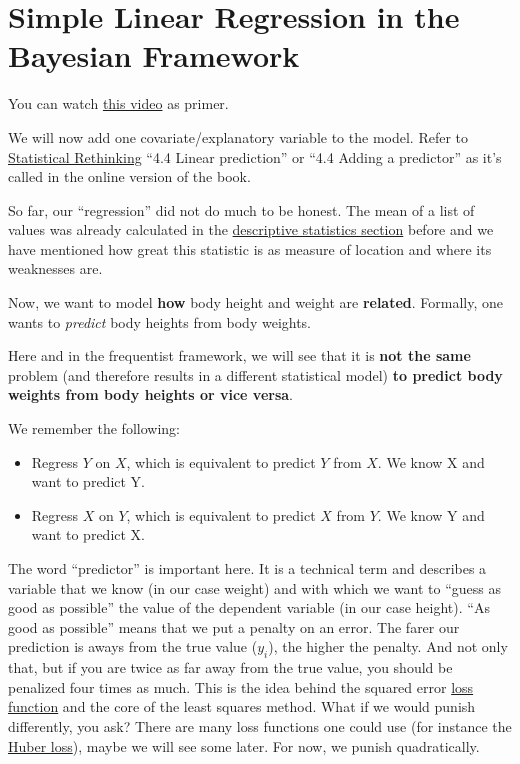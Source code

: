 \documentclass[
]{book}
\providecommand{\tightlist}{%
  \setlength{\itemsep}{0pt}\setlength{\parskip}{0pt}}
\begin{document}
\section{Simple Linear Regression in the Bayesian Framework}\label{simple_lin_reg_bayes}

You can watch \href{https://www.youtube.com/watch?v=14mkCpJ7tKs&ab_channel=VeryNormal}{this video} as primer.

We will now add one covariate/explanatory variable to the model.
Refer to \href{https://civil.colorado.edu/~balajir/CVEN6833/bayes-resources/RM-StatRethink-Bayes.pdf}{Statistical Rethinking}
``4.4 Linear prediction'' or ``4.4 Adding a predictor'' as it's called in the online version of the book.

So far, our ``regression'' did not do much to be honest. The mean of a list of values
was already calculated in the \href{https://jdegenfellner.github.io/Script_QM1_ZHAW/descriptive_stats.html}{descriptive statistics section}
before and we have mentioned how great this statistic is as measure of location and where its weaknesses are.

Now, we want to model \textbf{how} body height and weight are \textbf{related}.
Formally, one wants to \emph{predict} body heights from body weights.

Here and in the frequentist framework, we will see that it is \textbf{not the same}
problem (and therefore results in a different statistical model)
\textbf{to predict body weights from body heights or vice versa}.

We remember the following:

\begin{itemize}
\tightlist
\item
  Regress \(Y\) on \(X\), which is equivalent to predict \(Y\) from \(X\).
  We know X and want to predict Y.
\item
  Regress \(X\) on \(Y\), which is equivalent to predict \(X\) from \(Y\).
  We know Y and want to predict X.
\end{itemize}

The word ``predictor'' is important here. It is a technical term
and describes a variable that we know (in our case weight) and with
which we want to ``guess as good as possible'' the value of the
dependent variable (in our case height). ``As good as possible''
means that we put a penalty on an error. The farer our prediction
is aways from the true value (\(y_i\)), the higher the penalty.
And not only that, but if you are twice as far away from the true value,
you should be penalized four times as much. This is the idea behind
the squared error \href{https://en.wikipedia.org/wiki/Loss_function}{loss function}
and the core of the least squares method.
What if we would punish differently, you ask?
There are many loss functions one could use
(for instance the \href{https://en.wikipedia.org/wiki/Huber_loss}{Huber loss}),
maybe we will see some later. For now, we punish quadratically.
\end{document}
